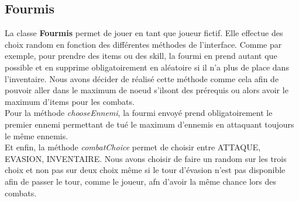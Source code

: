 	\subsection{Fourmis}
		La classe \textbf{Fourmis} permet de jouer en tant que joueur fictif. Elle effectue des choix random en fonction des différentes méthodes de l'interface.
		Comme par exemple, pour prendre des items ou des skill, la fourmi en prend autant que possible et en supprime obligatoirement en aléatoire si il n'a plus de place dans l'inventaire. Nous avons décider de réalisé cette méthode comme cela afin de pouvoir aller dans le maximum de noeud s'ilsont des prérequis ou alors avoir le maximum d'items pour les combats.\\
		Pour la méthode \textit{chooseEnnemi}, la fourmi envoyé prend obligatoirement le premier ennemi permettant de tué le maximum d'ennemis en attaquant toujours le même ennemis.\\
		Et enfin, la méthode \textit{combatChoice} permet de choisir entre ATTAQUE, EVASION, INVENTAIRE. Nous avons choisir de faire un random sur les trois choix et non pas sur deux choix même si le tour d'évasion n'est pas disponible afin de passer le tour, comme le joueur, afn d'avoir la même chance lors des combats.
